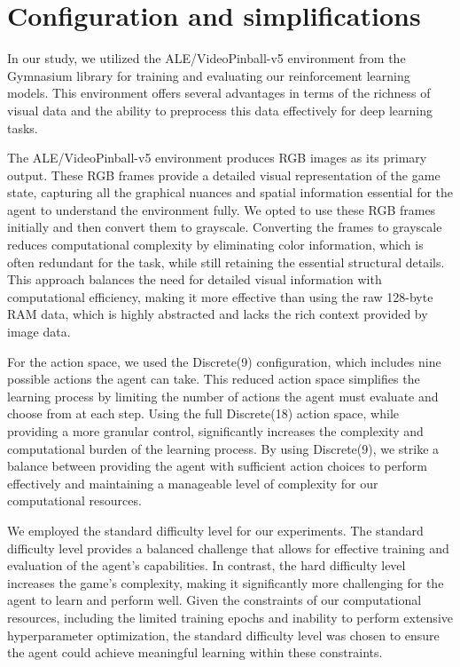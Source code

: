 \documentclass[twocolumn]{webofc}
\begin{document}
\section{Configuration and simplifications}
In our study, we utilized the ALE/VideoPinball-v5 environment from the Gymnasium library for training and evaluating our reinforcement learning models. This environment offers several advantages in terms of the richness of visual data and the ability to preprocess this data effectively for deep learning tasks. \cite{gymnasium}

The ALE/VideoPinball-v5 environment produces RGB images as its primary output. These RGB frames provide a detailed visual representation of the game state, capturing all the graphical nuances and spatial information essential for the agent to understand the environment fully. We opted to use these RGB frames initially and then convert them to grayscale. Converting the frames to grayscale reduces computational complexity by eliminating color information, which is often redundant for the task, while still retaining the essential structural details. This approach balances the need for detailed visual information with computational efficiency, making it more effective than using the raw 128-byte RAM data, which is highly abstracted and lacks the rich context provided by image data. \cite{mnih2013playingatarideepreinforcement}

For the action space, we used the Discrete(9) configuration, which includes nine possible actions the agent can take. This reduced action space simplifies the learning process by limiting the number of actions the agent must evaluate and choose from at each step. Using the full Discrete(18) action space, while providing a more granular control, significantly increases the complexity and computational burden of the learning process. By using Discrete(9), we strike a balance between providing the agent with sufficient action choices to perform effectively and maintaining a manageable level of complexity for our computational resources. \cite{gymnasium}

We employed the standard difficulty level for our experiments. The standard difficulty level provides a balanced challenge that allows for effective training and evaluation of the agent's capabilities. In contrast, the hard difficulty level increases the game's complexity, making it significantly more challenging for the agent to learn and perform well. Given the constraints of our computational resources, including the limited training epochs and inability to perform extensive hyperparameter optimization, the standard difficulty level was chosen to ensure the agent could achieve meaningful learning within these constraints. \cite{gymnasium} 
\end{document}
